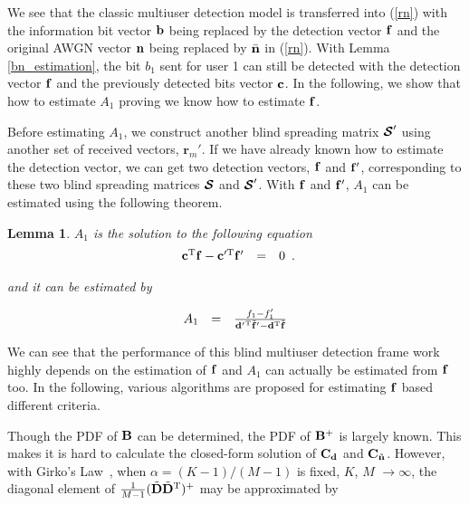 \documentclass[a4paper,11pt,fleqn]{article}
\newtheorem{lemma}{Lemma}
\newcommand{\br}{{\mathbf r}}
\newcommand{\bb}{{\bf b}}
\newcommand{\bc}{{\bf c}}
\newcommand{\bC}{{\bf C}}
\newcommand{\bd}{{\bf d}}
\newcommand{\bn}{{\bf n}}
\newcommand{\bbf}{{\bf f}}
\newcommand{\bD}{{\bf D}}
\newcommand{\bB}{{\bf B}}
\newcommand{\bcS}{{\mbox {\boldmath ${\cal S}$}}}
\begin{document}
We see that the classic multiuser detection model is transferred
into (\ref{rn}) with the information bit vector $\bb$ being
replaced by the detection vector $\bbf$ and the original AWGN
vector $\bn$ being replaced by $\bar{\bn}$ in (\ref{rn}). With
Lemma \ref{bn_estimation}, the bit $b_1$ sent for user 1 can still
be detected with the detection vector $\bbf$ and the previously
detected bits vector $\bc$. In the following, we show that how to
estimate $A_1$ proving we know how to estimate $\bbf$.

Before estimating $A_1$, we construct another blind spreading
matrix $\bcS'$ using another set of received vectors, $\br_m'$. If
we have already known how to estimate the detection vector, we can
get two detection vectors, $\bbf$ and $\bbf'$, corresponding to
these two blind spreading matrices $\bcS$ and $\bcS'$. With $\bbf$
and $\bbf'$, $A_1$ can be estimated using the following theorem.

\begin{lemma}
$A_1$ is the solution to the following equation
\begin{equation}
\begin{array}{rcl}
\bc^{\rm T}\bbf - \bc'^{\rm T}\bbf'&=&0
\end{array}.
\end{equation}


\noindent and it can be estimated by

\begin{equation}
\begin{array}{rcl}
A_1&=&{ f_{1} - f'_{1} \over {\bd'}^{\rm T}\tilde{\bbf}' -
{\bd}^{\rm T}\tilde{\bbf}}
\end{array}
\end{equation}
\end{lemma}


We can see that the performance of this blind multiuser detection
frame work highly depends on the estimation of $\bbf$ and $A_1$
can actually be estimated from $\bbf$ too. In the following,
various algorithms are proposed for estimating $\bbf$ based
different criteria.




Though the PDF of $\bB$ can be determined, the PDF of $\bB^{+}$ is
largely known. This makes it is hard to calculate the closed-form
solution of $\bC_{\bd}$ and $\bC_{\tilde{\bn}}$. However, with
Girko's Law~\cite{Muller,Hanly90}, when $\alpha=(K-1)/(M-1)$ is
fixed, $K$, $M$ $\rightarrow\infty$, the diagonal element of
$\frac{1}{M-1}(\tilde{\bD}\tilde{\bD}^{\rm T})^{+}$ may be
approximated by
\end{document}
